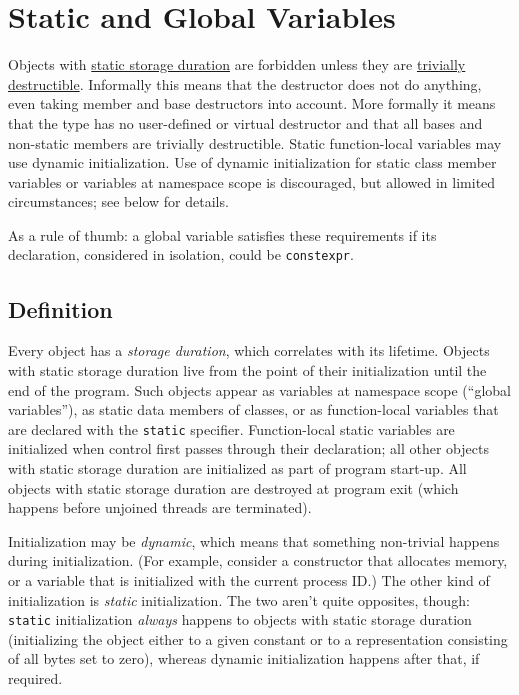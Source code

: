 
\section{Static and Global Variables}\label{sec:static-and-global-variables}
Objects with \href{http://en.cppreference.com/w/cpp/language/storage_duration#Storage_duration}{static storage duration} are forbidden unless they are \href{http://en.cppreference.com/w/cpp/types/is_destructible}{trivially destructible}. Informally this means that the destructor does not do anything, even taking member and base destructors into account. More formally it means that the type has no user-defined or virtual destructor and that all bases and non-static members are trivially destructible. Static function-local variables may use dynamic initialization. Use of dynamic initialization for static class member variables or variables at namespace scope is discouraged, but allowed in limited circumstances; see below for details.

As a rule of thumb: a global variable satisfies these requirements if its declaration, considered in isolation, could be \texttt{constexpr}.

\subsection{Definition}
Every object has a \emph{storage duration}, which correlates with its lifetime. Objects with static storage duration live from the point of their initialization until the end of the program. Such objects appear as variables at namespace scope (\enquote{global variables}), as static data members of classes, or as function-local variables that are declared with the \texttt{static} specifier. Function-local static variables are initialized when control first passes through their declaration; all other objects with static storage duration are initialized as part of program start-up. All objects with static storage duration are destroyed at program exit (which happens before unjoined threads are terminated).

Initialization may be \emph{dynamic}, which means that something non-trivial happens during initialization. (For example, consider a constructor that allocates memory, or a variable that is initialized with the current process ID.) The other kind of initialization is \emph{static} initialization. The two aren't quite opposites, though: \texttt{static} initialization \emph{always} happens to objects with static storage duration (initializing the object either to a given constant or to a representation consisting of all bytes set to zero), whereas dynamic initialization happens after that, if required.

